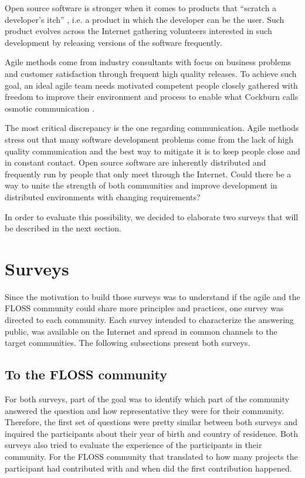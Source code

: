 \documentclass[lnbip]{svmultln}
\begin{document}
Open source software is stronger when it comes to products that
``scratch a developer's itch'' \cite{fitzgerald2000}, i.e. a product
in which the developer can be the user. Such product evolves across
the Internet gathering volunteers interested in such development by
releasing versions of the software frequently.

Agile methods come from industry consultants with focus on business
problems and customer satisfaction through frequent high quality
releases. To achieve such goal, an ideal agile team needs motivated
competent people closely gathered with freedom to improve their
environment and process to enable what Cockburn calls osmotic
communication \cite{cockburn2004}.

The most critical discrepancy is the one regarding
communication. Agile methods stress out that many software development
problems come from the lack of high quality communication and the best
way to mitigate it is to keep people close and in constant
contact. Open source software are inherently distributed and
frequently run by people that only meet through the Internet. Could
there be a way to unite the strength of both communities and improve
development in distributed environments with changing requirements?

In order to evaluate this possibility, we decided to elaborate two
surveys that will be described in the next section.

\section{Surveys}
\label{sec:surveys}

Since the motivation to build those surveys was to understand if the
agile and the FLOSS community could share more principles and
practices, one survey was directed to each community.  Each survey
intended to characterize the answering public, was available on the
Internet and spread in common channels to the target communities. The
following subsections present both surveys.

\subsection{To the FLOSS community}
\label{subsec:floss-survey}

For both surveys, part of the goal was to identify which part of the
community answered the question and how representative they were for
their community. Therefore, the first set of questions were pretty
similar between both surveys and inquired the participants about their
year of birth and country of residence. Both surveys also tried to
evaluate the experience of the participants in their community. For
the FLOSS community that translated to how many projects the
participant had contributed with and when did the first contribution
happened.
\end{document}
